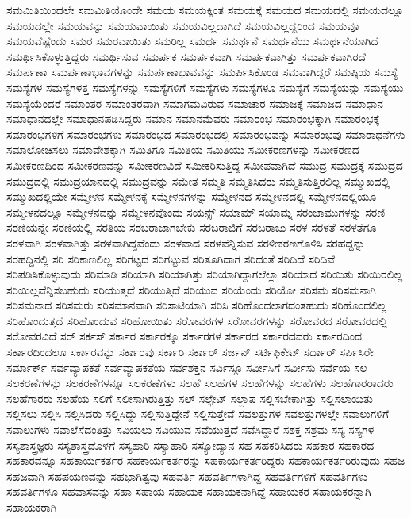 {ಸಮಮಿತಿಯಿಂದಲೇ
ಸಮಮಿತಿಯೊಂದೇ
ಸಮಯ
ಸಮಯಕ್ಕಿಂತ
ಸಮಯಕ್ಕೆ
ಸಮಯದ
ಸಮಯದಲ್ಲಿ
ಸಮಯದಲ್ಲೂ
ಸಮಯದಲ್ಲೇ
ಸಮಯವನ್ನು
ಸಮಯವಾಯಿತು
ಸಮಯವಿಲ್ಲದಾಗಿದೆ
ಸಮಯವಿಲ್ಲದ್ದರಿಂದ
ಸಮಯವೂ
ಸಮಯವೆಷ್ಟೆಂದು
ಸಮರ
ಸಮರವಾಯಿತು
ಸಮರಿಲ್ಲ
ಸಮರ್ಥ
ಸಮರ್ಥನೆ
ಸಮರ್ಥನೆಯ
ಸಮರ್ಥನೆಯಾಗಿದೆ
ಸಮರ್ಥಿಸಿಕೊಳ್ಳುತ್ತಿದ್ದರು
ಸಮರ್ಥಿಸುವ
ಸಮರ್ಪಕ
ಸಮರ್ಪಕವಾಗಿ
ಸಮರ್ಪಕವಾಗಿತ್ತು
ಸಮರ್ಪಕವಾಗಿರದೆ
ಸಮರ್ಪಣಾ
ಸಮರ್ಪಣಾಭಾವಗಳನ್ನು
ಸಮರ್ಪಣಾಭಾವವನ್ನು
ಸಮರ್ಪಿಸಿಕೊಂಡ
ಸಮವಾಗಿದ್ದರೆ
ಸಮಷ್ಠಿಯ
ಸಮಸ್ಯೆ
ಸಮಸ್ಯೆಗಳ
ಸಮಸ್ಯೆಗಳತ್ತ
ಸಮಸ್ಯೆಗಳನ್ನು
ಸಮಸ್ಯೆಗಳಿಗೆ
ಸಮಸ್ಯೆಗಳು
ಸಮಸ್ಯೆಗಳೂ
ಸಮಸ್ಯೆಗೆ
ಸಮಸ್ಯೆಯನ್ನು
ಸಮಸ್ಯೆಯು
ಸಮಸ್ಯೆಯೆಂದರೆ
ಸಮಾಂತರ
ಸಮಾಂತರವಾಗಿ
ಸಮಾಗಮವಿರುವ
ಸಮಾಚಾರ
ಸಮಾಜಕ್ಕೆ
ಸಮಾಜದ
ಸಮಾಧಾನ
ಸಮಾಧಾನದಲ್ಲೇ
ಸಮಾಧಾನಪಡಿಸಿದ್ದರು
ಸಮಾನ
ಸಮಾನಮೆವರು
ಸಮಾರಂಭ
ಸಮಾರಂಭಕ್ಕಾಗಿ
ಸಮಾರಂಭಕ್ಕೆ
ಸಮಾರಂಭಗಳಿಗೆ
ಸಮಾರಂಭಗಳು
ಸಮಾರಂಭದ
ಸಮಾರಂಭದಲ್ಲಿ
ಸಮಾರಂಭವನ್ನು
ಸಮಾರಂಭವು
ಸಮಾರಾಧನೆಗಳು
ಸಮಾಲೋಚಿಸಲು
ಸಮಾವೇಶಕ್ಕಾಗಿ
ಸಮಿತಿಗೂ
ಸಮಿತಿಯ
ಸಮಿತಿಯು
ಸಮೀಕರಣಗಳನ್ನು
ಸಮೀಕರಣದ
ಸಮೀಕರಣದಿಂದ
ಸಮೀಕರಣವನ್ನು
ಸಮೀಕರಣವಿದೆ
ಸಮೀಕರಿಸುತ್ತಿದ್ದ
ಸಮೀಪವಾಗಿದೆ
ಸಮುದ್ರ
ಸಮುದ್ರಕ್ಕೆ
ಸಮುದ್ರದ
ಸಮುದ್ರದಲ್ಲಿ
ಸಮುದ್ರಯಾನದಲ್ಲಿ
ಸಮುದ್ರವನ್ನು
ಸಮೇತ
ಸಮ್ಮತಿ
ಸಮ್ಮತಿಸಿದರು
ಸಮ್ಮತಿಸುತ್ತಿರಲಿಲ್ಲ
ಸಮ್ಮುಖದಲ್ಲಿ
ಸಮ್ಮುಖದಲ್ಲಿಯೇ
ಸಮ್ಮೇಳನ
ಸಮ್ಮೇಳನಕ್ಕೆ
ಸಮ್ಮೇಳನಗಳನ್ನು
ಸಮ್ಮೇಳನದ
ಸಮ್ಮೇಳನದಲ್ಲಿ
ಸಮ್ಮೇಳನದಲ್ಲಿಯೂ
ಸಮ್ಮೇಳನದಲ್ಲೂ
ಸಮ್ಮೇಳನವನ್ನು
ಸಮ್ಮೇಳನವೊಂದು
ಸಯನ್ಸ್
ಸಯಾಮ್
ಸಯಾಮ್ನ
ಸರಂಜಾಮುಗಳನ್ನು
ಸರಣಿ
ಸರಣಿಯನ್ನೇ
ಸರಣಿಯಲ್ಲಿ
ಸರತಿಯ
ಸರಬರಾಜಾಗಬೇಕು
ಸರಬರಾಜಿಗೆ
ಸರಬರಾಜು
ಸರಳ
ಸರಳತೆ
ಸರಳತೆಗೂ
ಸರಳವಾಗಿ
ಸರಳವಾಗಿತ್ತು
ಸರಳವಾಗಿದ್ದವೆಂದು
ಸರಳವಾದ
ಸರಳವೆನ್ನಿಸುವ
ಸರಳೀಕರಣಗೊಳಿಸಿ
ಸರಹದ್ದನ್ನು
ಸರಹದ್ದಿನಲ್ಲಿ
ಸರಿ
ಸರಿಕಾಣಲಿಲ್ಲ
ಸರಿಗಟ್ಟದ
ಸರಿಗಟ್ಟುವ
ಸರಿತೂಗಿದಾಗ
ಸರಿದಂತೆ
ಸರಿದಿದೆ
ಸರಿದಿವೆ
ಸರಿಪಡಿಸಿಕೊಳ್ಳುವುದು
ಸರಿಮಾಡಿ
ಸರಿಯಾಗಿ
ಸರಿಯಾಗಿತ್ತು
ಸರಿಯಾಗಿದ್ದಾಗಲೆಲ್ಲಾ
ಸರಿಯಾದ
ಸರಿಯಿತು
ಸರಿಯಿರಲಿಲ್ಲ
ಸರಿಯಿಲ್ಲವೆನ್ನಿಸಬಹುದು
ಸರಿಯುತ್ತದೆ
ಸರಿಯುತ್ತಿದೆ
ಸರಿಯುವ
ಸರಿಯೆಂದು
ಸರಿಯೋ
ಸರಿಸಮ
ಸರಿಸಮನಾಗಿ
ಸರಿಸಮನಾದ
ಸರಿಸಮರು
ಸರಿಸಮಾನವಾಗಿ
ಸರಿಸಾಟಿಯಾಗಿ
ಸರಿಸಿ
ಸರಿಹೊಂದಲಾಗದಂತಹುದು
ಸರಿಹೊಂದಲಿಲ್ಲ
ಸರಿಹೊಂದುತ್ತದೆ
ಸರಿಹೊಂದುವ
ಸರಿಹೋಯಿತು
ಸರೋವರಗಳ
ಸರೋವರಗಳನ್ನು
ಸರೋವರದ
ಸರೋವರದಲ್ಲಿ
ಸರೋವರವಿದೆ
ಸರ್
ಸರ್ಕಸ್
ಸರ್ಕಾರ
ಸರ್ಕಾರಕ್ಕೂ
ಸರ್ಕಾರಗಳ
ಸರ್ಕಾರದ
ಸರ್ಕಾರದವರು
ಸರ್ಕಾರದಿಂದ
ಸರ್ಕಾರದಿಂದಲೂ
ಸರ್ಕಾರವನ್ನು
ಸರ್ಕಾರವು
ಸರ್ಕಾರಿ
ಸರ್ಕಾರ್
ಸರ್ಜನ್
ಸರ್ಟಿಫಿಕೇಟ್
ಸರ್ದಾರ್
ಸರ್ಪಿಸಿರೇ
ಸರ್ಮಾರ್ಕ್
ಸರ್ವವ್ಯಾಪಕತೆ
ಸರ್ವವ್ಯಾಪಕತೆಯ
ಸರ್ವಶಕ್ತನ
ಸರ್ವಿಸ್ಗೂ
ಸರ್ವೀಸಿಗೆ
ಸರ್ವೀಸು
ಸರ್ವೆಯ
ಸಲ
ಸಲಕರಣೆಗಳನ್ನು
ಸಲಕರಣೆಗಳನ್ನೂ
ಸಲಕರಣೆಗಳು
ಸಲಹೆ
ಸಲಹೆಗಳ
ಸಲಹೆಗಳನ್ನು
ಸಲಹೆಗಳು
ಸಲಹೆಗಾರರಾದರು
ಸಲಹೆಗಾರರು
ಸಲಹೆಯ
ಸಲಿಗೆ
ಸಲೀಸಾಗಿರುತ್ತಿತ್ತು
ಸಲ್
ಸಲ್ಫೇಟ್
ಸಲ್ಲಾಪ
ಸಲ್ಲಿಸಬೇಕಾಗಿತ್ತು
ಸಲ್ಲಿಸಲಾಯಿತು
ಸಲ್ಲಿಸಲು
ಸಲ್ಲಿಸಿ
ಸಲ್ಲಿಸಿದರು
ಸಲ್ಲಿಸಿದ್ದು
ಸಲ್ಲಿಸುತ್ತಿದ್ದೇನೆ
ಸಲ್ಲಿಸುತ್ತೇವೆ
ಸವಲತ್ತುಗಳ
ಸವಲತ್ತುಗಳಲ್ಲೇ
ಸವಾಲುಗಳಿಗೆ
ಸವಾಲುಗಳು
ಸವಾಲೆಸೆದಂತಿತ್ತು
ಸವಿಯಲು
ಸವಿಯುವ
ಸವೆಯುತ್ತದೆ
ಸವೆಸಿದ್ದಾರೆ
ಸಶಕ್ತ
ಸಶ್ರಮ
ಸಸ್ಯ
ಸಸ್ಯಗಳ
ಸಸ್ಯಶಾಸ್ತ್ರಜ್ಞರು
ಸಸ್ಯಶಾಸ್ತ್ರದೊಳಗೆ
ಸಸ್ಯಹಾರಿ
ಸಸ್ಯಾಹಾರಿ
ಸಸ್ಯೋದ್ಯಾನ
ಸಹ
ಸಹಕರಿಸಿದರು
ಸಹಕಾರ
ಸಹಕಾರದ
ಸಹಕಾರವನ್ನೂ
ಸಹಕಾರ್ಯಕರ್ತರ
ಸಹಕಾರ್ಯಕರ್ತರನ್ನು
ಸಹಕಾರ್ಯಕರ್ತರಿದ್ದರು
ಸಹಕಾರ್ಯಕರ್ತರಿರುವುದು
ಸಹಜ
ಸಹಜವಾಗಿ
ಸಹಪಯಣವನ್ನು
ಸಹಭಾಗಿತ್ವವು
ಸಹವರ್ತಿ
ಸಹವರ್ತಿಗಳಾಗಿದ್ದ
ಸಹವರ್ತಿಗಳಿಗೆ
ಸಹವರ್ತಿಗಳು
ಸಹವರ್ತಿಗಳೂ
ಸಹವಾಸವನ್ನು
ಸಹಾ
ಸಹಾಯ
ಸಹಾಯಕ
ಸಹಾಯಕನಾಗಿದ್ದೆ
ಸಹಾಯಕರ
ಸಹಾಯಕರನ್ನಾಗಿ
ಸಹಾಯಕರಾಗಿ
}
